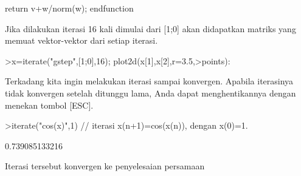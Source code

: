 \documentclass[a4paper,10pt]{article}
\begin{document}
\begin{eulernotebook}
\begin{eulercomment}
\begin{eulercomment}
\begin{eulercomment}
\begin{eulercomment}
\begin{eulercomment}
\begin{eulercomment}
\begin{eulercomment}
\begin{eulercomment}
\begin{eulercomment}
\begin{eulercomment}
\begin{eulercomment}
\begin{eulercomment}
\begin{eulercomment}
\begin{eulercomment}
\begin{eulercomment}
\begin{eulercomment}
\begin{eulercomment}
\begin{eulercomment}
\begin{eulercomment}
\begin{eulercomment}
\begin{eulercomment}
\begin{eulercomment}
\begin{eulerudf}
  return v+w/norm(w);
  endfunction
\end{eulerudf}
\begin{eulercomment}
Jika dilakukan iterasi 16 kali dimulai dari [1;0] akan didapatkan matriks yang memuat
vektor-vektor dari setiap iterasi.
\end{eulercomment}
\begin{eulerprompt}
>x=iterate("gstep",[1;0],16); plot2d(x[1],x[2],r=3.5,>points):
\end{eulerprompt}
\begin{eulercomment}
\begin{eulercomment}
\begin{eulercomment}
Terkadang kita ingin melakukan iterasi sampai konvergen. Apabila iterasinya tidak konvergen
setelah ditunggu lama, Anda dapat menghentikannya dengan menekan tombol [ESC].
\end{eulercomment}
\begin{eulerprompt}
>iterate("cos(x)",1) // iterasi x(n+1)=cos(x(n)), dengan x(0)=1.
\end{eulerprompt}
\begin{euleroutput}
  0.739085133216
\end{euleroutput}
\begin{eulercomment}
Iterasi tersebut konvergen ke penyelesaian persamaan


\end{eulercomment}
\end{eulercomment}
\end{eulercomment}
\end{eulercomment}
\end{eulercomment}
\end{eulercomment}
\end{eulercomment}
\end{eulercomment}
\end{eulercomment}
\end{eulercomment}
\end{eulercomment}
\end{eulercomment}
\end{eulercomment}
\end{eulercomment}
\end{eulercomment}
\end{eulercomment}
\end{eulercomment}
\end{eulercomment}
\end{eulercomment}
\end{eulercomment}
\end{eulercomment}
\end{eulercomment}
\end{eulercomment}
\end{eulercomment}
\end{eulercomment}
\end{eulernotebook}
\end{document}
